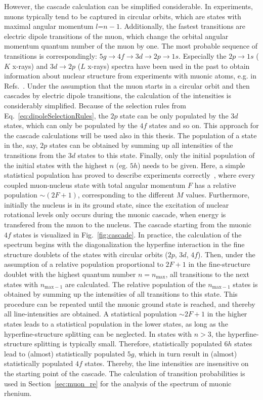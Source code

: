 However, the cascade calculation can be simplified considerable. In experiments, muons typically tend to be captured in circular orbits, which are states with maximal angular momentum $l$=$n-1$. Additionally, the fastest transitions are electric dipole transitions of the muon, which change the orbital angular momentum quantum number of the muon by one. The most probable sequence of transitions is correspondingly: $5g\rightarrow 4f \rightarrow 3d \rightarrow 2p \rightarrow 1s$. Especially the $2p\rightarrow 1s$ ($K$ x-rays) and $3d\rightarrow 2p$ ($L$ x-rays) spectra have been used in the past to obtain information about nuclear structure from experiments with muonic atoms, e.g. in Refs.~\cite{tanaka1983,tanaka1984,tanaka1984_2,hitlin1970,Dey1979,dewit1966,Bergem1988}. Under the assumption that the muon starts in a circular orbit and then cascades by electric dipole transitions, the calculation of the intensities is considerably simplified. Because of the selection rules from Eq.~\eqref{eq:dipoleSelectionRules}, the $2p$ state can be only populated by the $3d$ states, which can only be populated by the $4f$ states and so on. This approach for the cascade calculations will be used also in this thesis. The population of a state in the, say, $2p$ states can be obtained by summing up all intensities of the transitions from the $3d$ states to this state. Finally, only the initial population of the initial states with the highest $n$ (eg. $5h$) needs to be given. Here, a simple statistical population has proved to describe experiments correctly~\cite{Dey1979}, where every coupled muon-nucleus state with total angular momentum $F$ has a relative population $\sim (2F+1)$, corresponding to the different $M$ values. Furthermore, initially the nucleus is in its ground state, since the excitation of nuclear rotational levels only occurs during the muonic cascade, when energy is transfered from the muon to the nucleus.
The cascade starting from the muonic $4f$ states is visualized in Fig.~\ref{fig:cascade}. In practice, the calculation of the spectrum begins with the diagonalization the hyperfine interaction in the fine structure doublets of the states with circular orbits ($2p$, $3d$, $4f$). Then, under the assumption of a relative population proportional to $2F+1$ in the fine-structure doublet with the highest quantum number $n=n_{\text{max}}$, all transitions to the next states with $n_{\text{max}-1}$ are calculated. The relative population of the $n_{\text{max}-1}$ states is obtained by summing up the intensities of all transitions to this state. This procedure can be repeated until the muonic ground state is reached, and thereby all line-intensities are obtained. A statistical population $\sim 2F+1$ in the higher states leads to a statistical population in the lower states, as long as the hyperfine-structure  splitting can be neglected. In states with $n>3$, the hyperfine-structure splitting is typically small. Therefore, statistically populated $6h$ states lead to (almost) statistically populated $5g$, which in turn result in (almost) statistically populated $4f$ states. Thereby, the line intensities are insensitive on the starting point of the cascade. The calculation of transition probabilities is used in Section~\ref{sec:muon_re} for the analysis of the spectrum of muonic rhenium.
